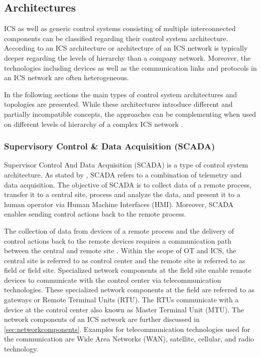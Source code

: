 \subsection{Architectures}
\label{sec:architectures}
ICS as well as generic control systems consisting of multiple interconnected components can be classified regarding their control system architecture.
According to \citeauthor{Galloway2013} \cite{Galloway2013} an ICS architecture or architecture of an ICS network is typically deeper regarding the levels of hierarchy than a company network.
Moreover, the technologies including devices as well as the communication links and protocols in an ICS network are often heterogeneous.

In the following sections the main types of control system architectures and topologies are presented.
While these architectures introduce different and partially incompatible concepts, the approaches can be complementing when used on different levels of hierarchy of a complex ICS network \cite{Stouffer2023}.

\subsubsection{Supervisory Control \& Data Acquisition (SCADA)}
Supervisor Control And Data Acquisition (SCADA) is a type of control system architecture.
As stated by \citeauthor{bailey2003} \cite{bailey2003}, SCADA refers to a combination of telemetry and data acquisition.
The objective of SCADA is to collect data of a remote process, transfer it to a central site, process and analyze the data, and present it to a human operator via Human Machine Interfaces (HMI).
Moreover, SCADA enables sending control actions back to the remote process.

The collection of data from devices of a remote process and the delivery of control actions back to the remote devices requires a communication path between the central and remote site \cite{Stouffer2023}.
Within the scope of OT and ICS, the central site is referred to as control center and the remote site is referred to as field or field site.
Specialized network components at the field site enable remote devices to communicate with the control center via telecommunication technologies.
These specialized network components at the field are referred to as gateways or Remote Terminal Units (RTU).
The RTUs communicate with a device at the control center also known as Master Terminal Unit (MTU).
The network components of an ICS network are further discussed in \autoref{sec:networkcomponents}.
Examples for telecommunication technologies used for the communication are Wide Area Networks (WAN), satellite, cellular, and radio technology.

